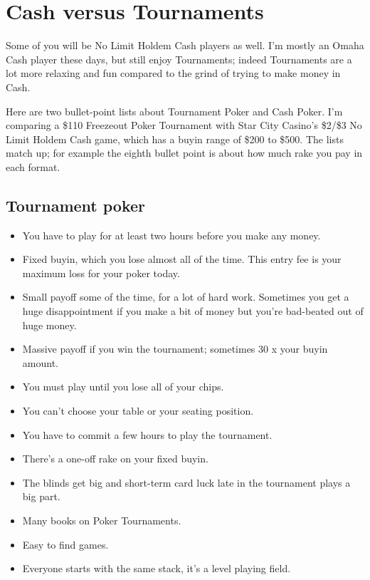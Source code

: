 \chapter{Cash versus Tournaments}

Some of you will be No Limit Holdem Cash players as well. I'm mostly
an Omaha Cash player these days, but still enjoy Tournaments; indeed
Tournaments are a lot more relaxing and fun compared to the grind of
trying to make money in Cash.

Here are two bullet-point lists about Tournament Poker and Cash
Poker. I'm comparing a \$110 Freezeout Poker Tournament with Star City
Casino's \$2/\$3 No Limit Holdem Cash game, which has a buyin range of
\$200 to \$500. The lists match up; for example the eighth bullet
point is about how much rake you pay in each format.


\section{Tournament poker}

\begin{itemize}
  \item You have to play for at least two hours before you make any money.
  \item Fixed buyin, which you lose almost all of the time. This entry
    fee is your maximum loss for your poker today.
  \item Small payoff some of the time, for a lot of hard
    work. Sometimes you get a huge disappointment if you make a bit of
    money but you're bad-beated out of huge money.
  \item Massive payoff if you win the tournament; sometimes 30 x your
    buyin amount.
  \item You must play until you lose all of your chips.
  \item You can't choose your table or your seating position.
  \item You have to commit a few hours to play the tournament.
  \item There's a one-off rake on your fixed buyin.
  \item The blinds get big and short-term card luck late in the
    tournament plays a big part.
  \item Many books on Poker Tournaments.
  \item Easy to find games.
  \item Everyone starts with the same stack, it's a level playing field.
\end{itemize}

